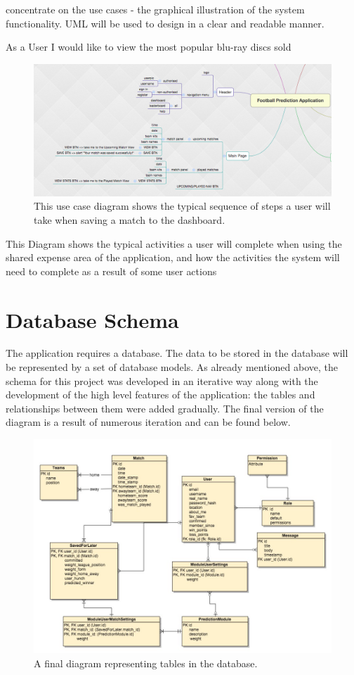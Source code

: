 concentrate on the use cases - the graphical illustration of the system functionality. UML will be used to design in a clear and readable manner. 

As a User I would like to view the most popular blu-ray discs sold


\begin{figure}[H]
	\begin{center}
		\includegraphics[width=.90\textwidth]{design/images/mindmap}
		\caption{This use case diagram shows the typical sequence of steps a user will take when saving a match to the dashboard.} \label{fig:using:usecase1}
	\end{center}
\end{figure}
This Diagram shows the typical activities a user will complete when using the shared expense area of the application, and how the activities the system will need to complete as a result of some user actions

\section{Database Schema}
\label{databaseschema_prototype}
The application requires a database. The data to be stored in the database will be represented by a set of database models. As already mentioned above, the schema for this project was developed in an iterative way along with the development of the high level features of the application: the tables and relationships between them were added gradually. The final version of the diagram is a result of numerous iteration and can be found below.

\begin{figure}[H]
	\begin{center}
		\includegraphics[width=.90\textwidth]{design/images/database_export.jpg}
		\caption{A final diagram representing tables in the database.}
		\label{fig:using:mindmap}
	\end{center}
\end{figure}